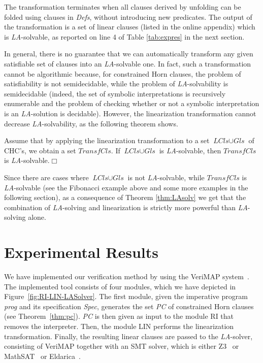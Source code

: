 \documentclass[english]{tlp}
\newcommand{\eop}{\hfill$\Box$}
\begin{document}
The transformation terminates 
when all clauses derived by unfolding can be folded using clauses in
\textit{Defs}, without introducing new predicates.
The output of the transformation is a set of linear clauses (listed in the
online appendix) which is {\it LA}-solvable, as reported on line 4 of Table \ref{tab:expres} in the 
next section.

In general, there is no guarantee that we can automatically transform any given satisfiable set of clauses into an {\it LA}-solvable one. In fact, such a transformation cannot be algorithmic because, for constrained Horn clauses, the problem of satisfiability is not semidecidable, while the problem of {\it LA}-solvability is semidecidable (indeed, the set of symbolic interpretations is recursively enumerable and the problem of checking whether or not a symbolic interpretation is an {\it LA}-solution is decidable).
However, the {\rm linearization} transformation cannot decrease {\it LA}-solvability, as the following theorem shows. 

\vspace{-2mm}
\begin{theorem}
\label{thm:LAsolv}Assume that by applying
the {\rm linearization} transformation to a set $\textit{LCls}\cup \textit{Gls}$
of CHC's, we obtain a set $\textit{TransfCls}$. 
If $\textit{LCls}\cup \textit{Gls}$ is
{\it LA}-solvable, then $\textit{TransfCls}$ is {\it LA}-solvable.\eop
\end{theorem}

\vspace{-2mm}

Since there are cases where
$\textit{LCls}\cup \textit{Gls}$ is not \mbox{{\it LA}-solvable},
while $\textit{TransfCls}$ is  \mbox{{\it LA}-solvable} 
(see the Fibonacci example above
and some more examples in the following section), as a consequence of 
Theorem \ref{thm:LAsolv} we get that the combination of {\it LA}-solving and
{\rm linearization} is strictly 
more powerful than {\it LA}-solving alone.


\section{Experimental Results}
\label{sec:experiments}
We have implemented our verification method by using the VeriMAP system~\cite{De&14b}.
The implemented tool consists of four modules, which we have depicted in 
Figure~\ref{fig:RI-LIN-LASolver}. The first module, given the imperative 
program {\it prog} and its specification {\it Spec}, generates the set {\it PC}
of constrained Horn 
clauses  (see Theorem~\ref{thm:pc}). {\it PC\/} is then 
given as input to the module RI  that removes the 
interpreter. Then, the module LIN  
performs the {\rm linearization}  transformation. 
Finally, the resulting linear clauses are passed to the {\it LA}-solver, consisting
of \mbox{VeriMAP} together with an SMT solver, which is either 
Z3~\cite{DeB08} 
or MathSAT~\cite{MaS13} or Eldarica~\cite{Ru&13}. 
\end{document}
